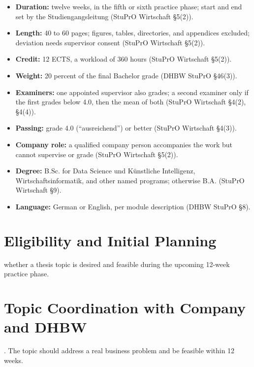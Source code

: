 \documentclass{../sharedAssets/tufte}
\begin{document}
\begin{itemize}\setlength\itemsep{0.2em}
    \item \textbf{Duration:} twelve weeks, in the fifth or sixth practice phase; start and
    end set by the Studiengangsleitung (StuPrO Wirtschaft \S5(2)).
    \item \textbf{Length:} 40 to 60 pages; figures, tables, directories, and appendices
    excluded; deviation needs supervisor consent (StuPrO Wirtschaft \S5(2)).
    \item \textbf{Credit:} 12 ECTS, a workload of 360 hours (StuPrO Wirtschaft \S5(2)).
    \item \textbf{Weight:} 20 percent of the final Bachelor grade (DHBW StuPrO \S46(3)).
    \item \textbf{Examiners:} one appointed supervisor also grades; a second examiner only
    if the first grades below 4.0, then the mean of both (StuPrO Wirtschaft \S4(2),
    \S4(4)).
    \item \textbf{Passing:} grade 4.0 (``ausreichend'') or better (StuPrO Wirtschaft
    \S4(3)).
    \item \textbf{Company role:} a qualified company person accompanies the work but
    cannot supervise or grade (StuPrO Wirtschaft \S5(2)).
    \item \textbf{Degree:} B.Sc.
    for Data Science und K\"unstliche Intelligenz, Wirtschaftsinformatik, and other named
    programs; otherwise B.A.
    (StuPrO Wirtschaft \S9).
    \item \textbf{Language:} German or English, per module description (DHBW StuPrO \S8).
\end{itemize}


\section{Eligibility and Initial Planning}
 whether a thesis topic is desired and
feasible during the upcoming 12-week practice phase.

\section{Topic Coordination with Company and DHBW}
.
The topic should address a real business problem and be feasible within 12 weeks.
\end{document}
